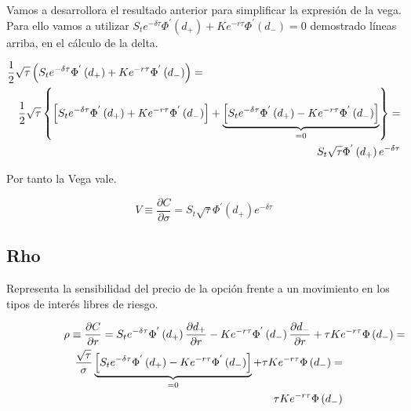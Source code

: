 \documentclass[12pt]{article}
\begin{document}
Vamos a desarrollora el resultado anterior para simplificar la expresi\'{o}n de la vega. Para ello vamos a utilizar
$S_{t}e^{-\delta\tau}\Phi^{'}\left(d_{+}\right)+Ke^{-r\tau}\Phi^{'}\left(d_{-}\right) = 0$ demostrado l\'{i}neas arriba, en el c\'{a}lculo
de la delta.
\newline

\begin{eqnarray}
	\lefteqn{\frac{1}{2}\sqrt{\tau}\left(S_{t}e^{-\delta\tau}\Phi^{'}\left(d_{+}\right) + 
	Ke^{-r\tau}\Phi^{'}\left(d_{-}\right)\right) = } \nonumber \\
	 & & \frac{1}{2}\sqrt{\tau}\left\{\left[S_{t} e^{-\delta\tau}\Phi^{'}\left(d_{+}\right) + 
	Ke^{-r\tau}\Phi^{'}\left(d_{-}\right)\right] + \underbrace{\left[S_{t} e^{-\delta\tau}\Phi^{'}\left(d_{+}\right) -
	Ke^{-r\tau}\Phi^{'}\left(d_{-}\right)\right]}_{=0}\right\} = \nonumber \\
	 & & S_{t}\sqrt{\tau}\Phi^{'}\left(d_{+}\right)e^{-\delta\tau} \nonumber
\end{eqnarray}
\newline

Por tanto la Vega vale.
\newline

\begin{equation}
	V \equiv \frac{\partial C}{\partial\sigma} = S_{t}\sqrt{\tau}\Phi^{'}\left(d_{+}\right)e^{-\delta\tau}
\end{equation}
\newline

\subsection{Rho}
Representa la sensibilidad del precio de la opci\'{o}n frente a un movimiento en los tipos de inter\'{e}s libres de riesgo.
\newline

\begin{eqnarray*}
	\lefteqn{\rho \equiv \frac{\partial C}{\partial r} = S_{t}e^{-\delta\tau}\Phi^{'}\left(d_{+}\right)\frac{\partial d_{+}}
		{\partial r} - Ke^{-r\tau}\Phi^{'}\left(d_{-}\right)\frac{\partial d_{-}}{\partial r} + \tau K e^{-r\tau}\Phi\left(
		d_{-}\right) = } \\
	 & & \frac{\sqrt{\tau}}{\sigma}\underbrace{\left[S_{t}e^{-\delta\tau}\Phi^{'}\left(d_{+}\right)-Ke^{-r\tau}\Phi^{'}\left(
		d_{-}\right)\right]}_{=0} + \tau K e^{-r\tau}\Phi\left(d_{-}\right) = \\
	 & & \tau K e^{-r\tau}\Phi\left(d_{-}\right) 
\end{eqnarray*}
\newline
\end{document}
